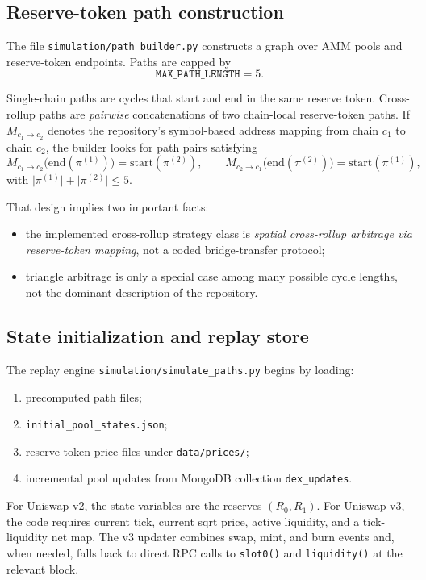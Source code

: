 \documentclass[11pt]{article}
\begin{document}
\subsection{Reserve-token path construction}

The file \texttt{simulation/path\_builder.py} constructs a graph over AMM pools and reserve-token endpoints. Paths are capped by
\[
\texttt{MAX\_PATH\_LENGTH} = 5.
\]

Single-chain paths are cycles that start and end in the same reserve token. Cross-rollup paths are \emph{pairwise} concatenations of two chain-local reserve-token paths. If \(M_{c_1\rightarrow c_2}\) denotes the repository's symbol-based address mapping from chain \(c_1\) to chain \(c_2\), the builder looks for path pairs satisfying
\[
M_{c_1\rightarrow c_2}\!\big(\mathrm{end}(\pi^{(1)})\big) = \mathrm{start}(\pi^{(2)}),
\qquad
M_{c_2\rightarrow c_1}\!\big(\mathrm{end}(\pi^{(2)})\big) = \mathrm{start}(\pi^{(1)}),
\]
with \(\lvert \pi^{(1)} \rvert + \lvert \pi^{(2)} \rvert \le 5\).

That design implies two important facts:
\begin{itemize}[leftmargin=1.5em]
    \item the implemented cross-rollup strategy class is \emph{spatial cross-rollup arbitrage via reserve-token mapping}, not a coded bridge-transfer protocol;
    \item triangle arbitrage is only a special case among many possible cycle lengths, not the dominant description of the repository.
\end{itemize}

\subsection{State initialization and replay store}

The replay engine \texttt{simulation/simulate\_paths.py} begins by loading:
\begin{enumerate}[label=\arabic*.]
    \item precomputed path files;
    \item \texttt{initial\_pool\_states.json};
    \item reserve-token price files under \texttt{data/prices/};
    \item incremental pool updates from MongoDB collection \texttt{dex\_updates}.
\end{enumerate}

For Uniswap v2, the state variables are the reserves \((R_0,R_1)\). For Uniswap v3, the code requires current tick, current sqrt price, active liquidity, and a tick-liquidity net map. The v3 updater combines swap, mint, and burn events and, when needed, falls back to direct RPC calls to \texttt{slot0()} and \texttt{liquidity()} at the relevant block.
\end{document}
